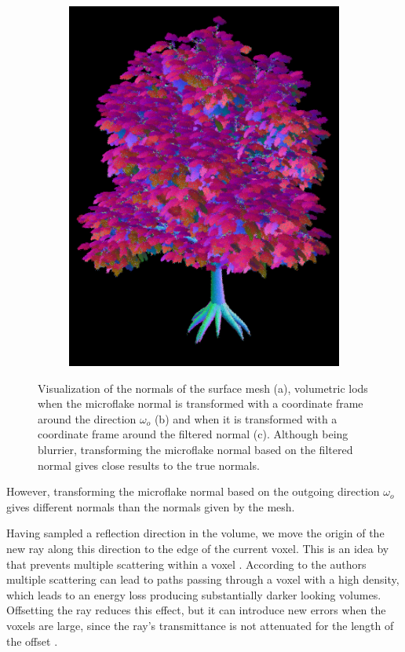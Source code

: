 \begin{figure}[t]
\begin{subfigure}[b]{0.3\linewidth}
        \includegraphics[width=1\linewidth]{img/normal_map_vndf_normal_aligned.png}
        \caption{}
    \end{subfigure}
    \caption[Visualization of normals with meshes and volumes]{Visualization of the normals of the surface mesh (a), volumetric \acsp{lod} when the microflake normal is transformed with a coordinate frame around the direction $\omega_o$ (b) and when it is transformed with a coordinate frame around the filtered normal (c).
             Although being blurrier, transforming the microflake normal based on the filtered normal gives close results to the true normals.}
	\label{fig:tree_normal_maps}
\end{figure}
However, transforming the microflake normal based on the outgoing direction $\omega_o$ gives different normals than the normals given by the mesh.

Having sampled a reflection direction in the volume, we move the origin of the new ray along this direction to the edge of the current voxel.
This is an idea by \citeauthor{vicini2021non} that prevents multiple scattering within a voxel \cite{vicini2021non}.
According to the authors multiple scattering can lead to paths passing through a voxel with a high density, which leads to an energy loss producing substantially darker looking volumes.
Offsetting the ray reduces this effect, but it can introduce new errors when the voxels are large, since the ray's transmittance is not attenuated for the length of the offset \cite{vicini2021non}.